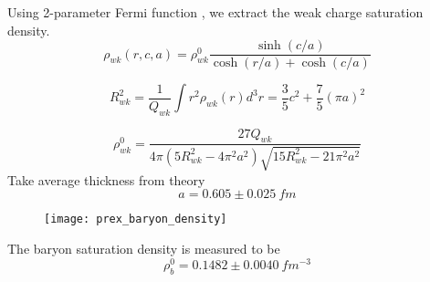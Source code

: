 Using 2-parameter Fermi function \cite{PhysRevC.102.044321}, we extract the 
weak charge saturation density.
\begin{equation}
    \rho_{wk}(r, c, a) = \rho^0_{wk} \frac{\sinh(c/a)}{\cosh(r/a) + \cosh(c/a)}
\end{equation}

\begin{equation}
    R^2_{wk} = \frac{1}{Q_{wk}}\int r^2 \rho_{wk}(r)d^3r = \frac{3}{5}c^2 + \frac{7}{5}(\pi a)^2
\end{equation}

\begin{equation}
    \rho^0_{wk} = \frac{27 Q_{{wk}}}{4\pi(5R^2_{wk} - 4\pi^2 a^2)\sqrt{15R^2_{wk} - 21\pi^2 a^2}}
\end{equation}
Take average thickness from theory
\begin{equation}
    a = 0.605 \pm 0.025\ fm
\end{equation}

\begin{figure}
    \centering
    \texttt{[image: prex\_baryon\_density]}
\end{figure}

The baryon saturation density is measured to be
\begin{equation}
    \rho^0_b = 0.1482 \pm 0.0040\ fm^{-3}
\end{equation}


